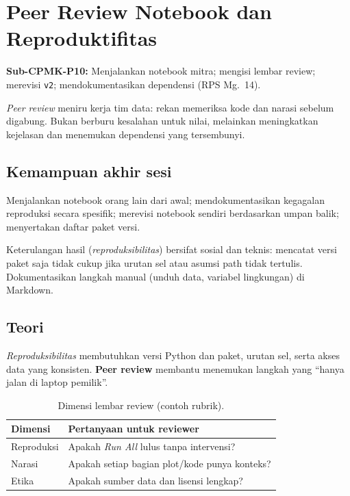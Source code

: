 \documentclass[../main.tex]{subfiles}
\begin{document}
\chapter{Peer Review Notebook dan Reproduktifitas}

\begin{subcpmk}
  \item \textbf{Sub-CPMK-P10:} Menjalankan notebook mitra; mengisi lembar review; merevisi \texttt{v2}; mendokumentasikan dependensi (RPS Mg.\ 14).
\end{subcpmk}


\noindent \textit{Peer review} meniru kerja tim data: rekan memeriksa kode dan narasi sebelum digabung. Bukan berburu kesalahan untuk nilai, melainkan meningkatkan kejelasan dan menemukan dependensi yang tersembunyi.

\section{Kemampuan akhir sesi}

Menjalankan notebook orang lain dari awal; mendokumentasikan kegagalan reproduksi secara spesifik; merevisi notebook sendiri berdasarkan umpan balik; menyertakan daftar paket versi.

Keterulangan hasil (\textit{reproduksibilitas}) bersifat sosial dan teknis: mencatat versi paket saja tidak cukup jika urutan sel atau asumsi path tidak tertulis. Dokumentasikan langkah manual (unduh data, variabel lingkungan) di Markdown.

\section{Teori}

\begin{konsep}
\textit{Reproduksibilitas} membutuhkan versi Python dan paket, urutan sel, serta akses data yang konsisten. \textbf{Peer review} membantu menemukan langkah yang ``hanya jalan di laptop pemilik''.
\end{konsep}

\begin{table}[htbp]
\centering
\caption{Dimensi lembar review (contoh rubrik).}
\label{tab:peer-review-dimensi}
\begin{tabular}{@{}p{3.6cm}p{9.1cm}@{}}
\toprule
\textbf{Dimensi} & \textbf{Pertanyaan untuk reviewer} \\
\midrule
Reproduksi & Apakah \textit{Run All} lulus tanpa intervensi? \\
Narasi & Apakah setiap bagian plot/kode punya konteks? \\
Etika & Apakah sumber data dan lisensi lengkap? \\
\bottomrule
\end{tabular}
\end{table}
\end{document}
